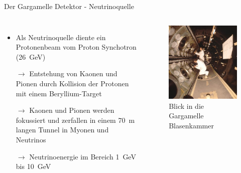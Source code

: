 \documentclass[aspectratio=1610, professionalfonts, 10pt]{beamer}
\begin{document}
\begin{frame}{Der Gargamelle Detektor - Neutrinoquelle}
	\begin{columns}
				\begin{itemize}
					\setlength\itemsep{0.5em}
					\item Als Neutrinoquelle diente ein Protonenbeam vom Proton Synchotron (\SI{26}{\giga\electronvolt})
					\item[$\rightarrow$] Entstehung von Kaonen und Pionen durch Kollision der Protonen mit einem Beryllium-Target
					\item[$\rightarrow$] Kaonen und Pionen werden fokussiert und zerfallen in einem \SI{70}{\metre} langen Tunnel in Myonen und Neutrinos
					\item[$\rightarrow$] Neutrinoenergie im Bereich \SI{1}{\giga\electronvolt} bis \SI{10}{\giga\electronvolt}
				\end{itemize}

			\begin{figure}
	  			\centering
				\includegraphics[width=\linewidth]{Images/7011042-A5-at-72-dpi.jpg}
	  			\caption{Blick in die Gargamelle Blasenkammer \cite{CERN-EX-7011042}}
	  			\label{fig:feynman}
			\end{figure}
	\end{columns}
\end{frame}
\end{document}
